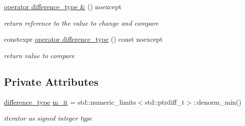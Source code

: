 \begin{DoxyCompactItemize}
\hypertarget{classnlohmann_1_1basic__json_1_1primitive__iterator__t_a451051247c47a686224c3600e28d6d11}{}\label{classnlohmann_1_1basic__json_1_1primitive__iterator__t_a451051247c47a686224c3600e28d6d11} 
\hyperlink{classnlohmann_1_1basic__json_1_1primitive__iterator__t_a451051247c47a686224c3600e28d6d11}{operator difference\+\_\+type \&} () noexcept
\begin{DoxyCompactList}\small\item\em return reference to the value to change and compare \end{DoxyCompactList}\item 
\hypertarget{classnlohmann_1_1basic__json_1_1primitive__iterator__t_a4ff65ffdd1b51eec2d144d9914939b48}{}\label{classnlohmann_1_1basic__json_1_1primitive__iterator__t_a4ff65ffdd1b51eec2d144d9914939b48} 
constexpr \hyperlink{classnlohmann_1_1basic__json_1_1primitive__iterator__t_a4ff65ffdd1b51eec2d144d9914939b48}{operator difference\+\_\+type} () const noexcept
\begin{DoxyCompactList}\small\item\em return value to compare \end{DoxyCompactList}\end{DoxyCompactItemize}
\subsection*{Private Attributes}
\begin{DoxyCompactItemize}
\item 
\hypertarget{classnlohmann_1_1basic__json_1_1primitive__iterator__t_aed1a94e17ea6a32cc75baa55e239b002}{}\label{classnlohmann_1_1basic__json_1_1primitive__iterator__t_aed1a94e17ea6a32cc75baa55e239b002} 
\hyperlink{classnlohmann_1_1basic__json_aec316934a555dd1acdd3600e5d4a4cdf}{difference\+\_\+type} \hyperlink{classnlohmann_1_1basic__json_1_1primitive__iterator__t_aed1a94e17ea6a32cc75baa55e239b002}{m\+\_\+it} = std\+::numeric\+\_\+limits$<$std\+::ptrdiff\+\_\+t$>$\+::denorm\+\_\+min()
\begin{DoxyCompactList}\small\item\em iterator as signed integer type \end{DoxyCompactList}\end{DoxyCompactItemize}
